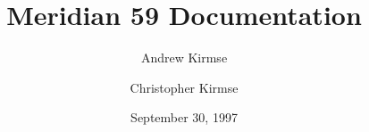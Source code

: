 
\title{Meridian 59 Documentation}
\author{Andrew Kirmse \and Christopher Kirmse}
\date{September 30, 1997}

\begin{titlepage}
\maketitle
\end{titlepage}
